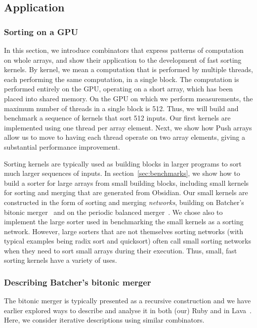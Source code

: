 \subsection{Application}
\label{sec:MARY}

\subsubsection{Sorting on a GPU}
In this section, we introduce combinators that express patterns
of computation on whole arrays, and show their application to the
development of fast sorting kernels.
By kernel, we mean a computation that is performed by multiple
threads, each performing the same computation, in a single block.
The computation is performed entirely on the GPU, operating on
a short array, which has been placed into shared memory.
On the GPU on which we perform measurements, the maximum number
of threads in a single block is 512. Thus, we will build and benchmark
a sequence of
kernels that sort 512 inputs.
Our first kernels are implemented using one thread per array element.
Next, we show how Push arrays allow us to move to having each
thread operate on two array elements, giving a substantial performance
improvement.

Sorting kernels are typically used as building blocks in larger
programs to sort much larger sequences of inputs. In section~\ref{sec:benchmarks},
we show how to build a sorter for large arrays from small building blocks, including
small kernels for sorting and merging that are generated from Obsidian.
Our small kernels are constructed in the form of sorting and merging {\em networks},
building on Batcher's bitonic merger~ and
on the periodic balanced merger~.
We chose also to implement the large sorter used  in benchmarking the
small kernels as a sorting network. However, large
sorters that are not themselves sorting networks (with typical examples being radix sort and quicksort) often call small sorting networks when they need to sort small arrays during their execution.
Thus, small, fast sorting kernels have a variety of uses.

\subsubsection{Describing Batcher's bitonic merger}

The bitonic merger is typically presented as a recursive
construction and we have earlier explored ways to describe
and analyse it in both (our) Ruby and in Lava~.
Here, we consider iterative descriptions using similar combinators.

